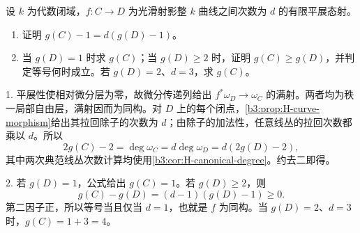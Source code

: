 
\begin{exercise}\label{b3:ex:I-etale-genus}
	设 \(k\) 为代数闭域，\(f:C\rightarrow D\) 为光滑射影整 \(k\) 曲线之间次数为 \(d\) 的有限平展态射。
	\begin{enumerate}
		\item 证明 \(g(C)-1=d(g(D)-1)\)。
		\item 当 \(g(D)=1\) 时求 \(g(C)\)；当 \(g(D)\ge2\) 时，证明 \(g(C)\ge g(D)\)，并判定等号何时成立。若 \(g(D)=2\)、\(d=3\)，求 \(g(C)\)。
	\end{enumerate}
\end{exercise}
\begin{solution}
	1. 平展性使相对微分层为零，故微分传递列给出 \(f^*\omega_D\rightarrow\omega_C\) 的满射。两者均为秩一局部自由层，满射因而为同构。对 \(D\) 上的每个闭点，\cref{b3:prop:H-curve-morphism}给出其拉回除子的次数为 \(d\)；由除子的加法性，任意线丛的拉回次数都乘以 \(d\)。所以
	\[
		2g(C)-2=\deg\omega_C
		=d\deg\omega_D=d(2g(D)-2),
	\]
	其中两次典范线丛次数计算均使用\cref{b3:cor:H-canonical-degree}。约去二即得。

	2. 若 \(g(D)=1\)，公式给出 \(g(C)=1\)。若 \(g(D)\ge2\)，则
	\[
		g(C)-g(D)=(d-1)(g(D)-1)\ge0.
	\]
	第二因子正，所以等号当且仅当 \(d=1\)，也就是 \(f\) 为同构。当 \(g(D)=2\)、\(d=3\) 时，\(g(C)=1+3=4\)。
\end{solution}

